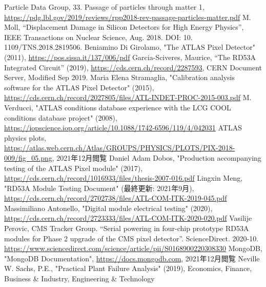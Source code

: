 \begin{thebibliography}{24}
Particle Data Group, 33. Passage of particles through matter 1,
\url{https://pdg.lbl.gov/2019/reviews/rpp2018-rev-passage-particles-matter.pdf}
M. Moll, “Displacement Damage in Silicon Detectors for High Energy Physics”, IEEE Transactions on Nuclear Science, Aug. 2018. DOI: 10. 1109/TNS.2018.2819506.
Beniamino Di Girolamo, "The ATLAS Pixel Detector" (2011), \url{https://pos.sissa.it/137/006/pdf}
Garcia-Sciveres, Maurice, “The RD53A Integrated Circuit” (2019), \url{https://cds.cern.ch/record/2287593}, CERN Document Server, Modified Sep 2019.
Maria Elena Stramaglia, "Calibration analysis software for the ATLAS Pixel Detector" (2015), \url{https://cds.cern.ch/record/2027805/files/ATL-INDET-PROC-2015-003.pdf}
M. Verducci, "ATLAS conditions database experience with the LCG COOL conditions database project" (2008),
\url{https://iopscience.iop.org/article/10.1088/1742-6596/119/4/042031}
ATLAS physics plots, \url{https://atlas.web.cern.ch/Atlas/GROUPS/PHYSICS/PLOTS/PIX-2018-009/fig_05.png}, 2021年12月閲覧
Daniel Adam Dobos, "Production accompanying testing of the ATLAS Pixel module" (2017),
\url{https://cds.cern.ch/record/1016933/files/thesis-2007-016.pdf}
Lingxin Meng, "RD53A Module Testing Document" (最終更新: 2021年9月), \\
\url{https://cds.cern.ch/record/2702738/files/ATL-COM-ITK-2019-045.pdf}
Massimiliano Antonello, "Digital module electrical testing" (2020), \\
\url{https://cds.cern.ch/record/2723333/files/ATL-COM-ITK-2020-020.pdf}
Vasilije Perovic, CMS Tracker Group. “Serial powering in four-chip prototype RD53A modules for Phase 2 upgrade of the CMS pixel detector”. ScienceDirect. 2020-10. \url{https://www.sciencedirect.com/science/article/pii/S0168900220308330}
MongoDB, "MongoDB Documentation", \url{https://docs.mongodb.com}, 2021年12月閲覧
Neville W. Sachs, P.E., "Practical Plant Failure Analysis" (2019), Economics, Finance, Business \& Industry, Engineering \& Technology
\end{thebibliography}
